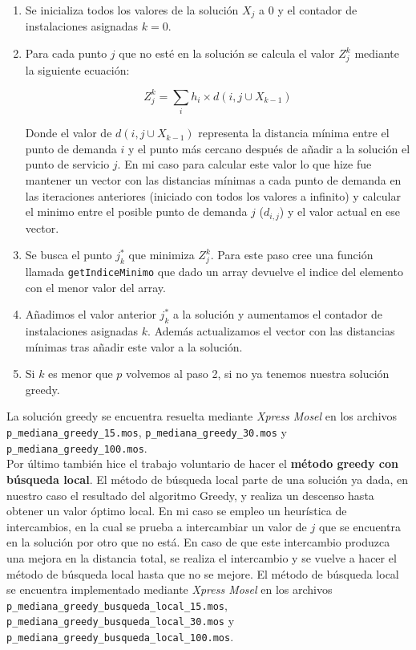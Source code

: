 \documentclass[a4paper,11pt]{article}
\begin{document}
\begin{enumerate}
\item Se inicializa todos los valores de la solución ${X_j}$ a 0 y el contador de instalaciones asignadas ${k=0}$.
\item Para cada punto ${j}$ que no esté en la solución se calcula el valor ${Z_{j}^{k}}$ mediante la siguiente ecuación:

\begin{equation}
Z_{j}^{k} = \sum_{i}{h_{i}\times d(i,j \cup X_{k-1})}
\end{equation}

Donde el valor de ${d(i,j \cup X_{k-1})}$ representa la distancia mínima entre el punto de demanda ${i}$ y el punto más cercano después de añadir a la solución el punto de servicio ${j}$. En mi caso para calcular este valor lo que hize fue mantener un vector con las distancias mínimas a cada punto de demanda en las iteraciones anteriores (iniciado con todos los valores a infinito) y calcular el minimo entre el posible punto de demanda ${j}$ (${d_{i,j}}$) y el valor actual en ese vector.

\item Se busca el punto ${j_{k}^{*}}$ que minimiza ${Z_{j}^{k}}$. Para este paso cree una función llamada \texttt{getIndiceMinimo} que dado un array devuelve el indice del elemento con el menor valor del array.

\item Añadimos el valor anterior ${j_{k}^{*}}$ a la solución y aumentamos el contador de instalaciones asignadas ${k}$. Además actualizamos el vector con las distancias mínimas tras añadir este valor a la solución.

\item Si ${k}$ es menor que ${p}$ volvemos al paso 2, si no ya tenemos nuestra solución greedy.
\end{enumerate}

La solución greedy se encuentra resuelta mediante \textit{Xpress Mosel} en los archivos \texttt{\\p\_mediana\_greedy\_15.mos}, \texttt{p\_mediana\_greedy\_30.mos} y \texttt{p\_mediana\_greedy\_100.mos}.\\

Por último también hice el trabajo voluntario de hacer el \textbf{método greedy con búsqueda local}. El método de búsqueda local parte de una solución ya dada, en nuestro caso el resultado del algoritmo Greedy, y realiza un descenso hasta obtener un valor óptimo local. En mi caso se empleo un heurística de intercambios, en la cual se prueba a intercambiar un valor de ${j}$ que se encuentra en la solución por otro que no está. En caso de que este intercambio produzca una mejora en la distancia total, se realiza el intercambio y se vuelve a hacer el método de búsqueda local hasta que no se mejore. El método de búsqueda local se encuentra implementado mediante \textit{Xpress Mosel} en los archivos \texttt{\\p\_mediana\_greedy\_busqueda\_local\_15.mos}, \texttt{p\_mediana\_greedy\_busqueda\_local\_30.mos} y \texttt{p\_mediana\_greedy\_busqueda\_local\_100.mos}.\\
\end{document}
